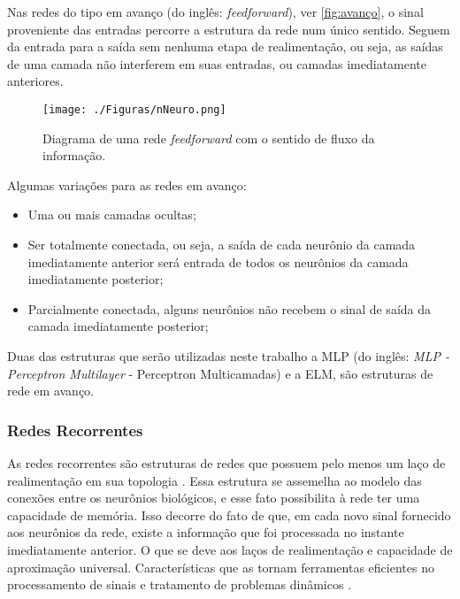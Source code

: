 Nas redes do tipo em avanço (do inglês: \textit{feedforward}), ver \autoref{fig:avanço}, o sinal proveniente das entradas percorre a estrutura da rede num único sentido. Seguem da entrada para a saída sem nenhuma etapa de realimentação, ou seja, as saídas de uma camada não interferem em suas entradas, ou camadas imediatamente anteriores.

\begin{figure}[H]
	\begin{center}
		\caption{Diagrama de uma rede \textit{feedforward} com o sentido de fluxo da informação.}
		\label{fig:avanço}
		\texttt{[image: ./Figuras/nNeuro.png]}%
	\end{center}
\end{figure}

Algumas variações para as redes em avanço:
\begin{itemize}
	\item Uma ou mais camadas ocultas;
	\item Ser totalmente conectada, ou seja, a saída de cada neurônio da camada imediatamente anterior será entrada de todos os neurônios da camada imediatamente posterior;
	\item Parcialmente conectada, alguns neurônios não recebem o sinal de saída da camada imediatamente posterior;
\end{itemize}

Duas das estruturas que serão utilizadas neste trabalho a MLP (do inglês: \textit{MLP - Perceptron Multilayer } - Perceptron Multicamadas) e a ELM, são estruturas de rede em avanço.

\subsubsection{Redes Recorrentes}

As redes recorrentes são estruturas de redes que possuem pelo menos um laço de realimentação em sua topologia \cite{book:simonhaykin2008}. Essa estrutura se assemelha ao modelo das conexões entre os neurônios biológicos, e esse fato possibilita à rede ter uma capacidade de memória. Isso decorre do fato de que, em cada novo sinal fornecido aos neurônios da rede, existe a informação que foi processada no instante imediatamente anterior. O que se deve aos laços de realimentação e capacidade de aproximação universal. Características que as tornam ferramentas eficientes no processamento de sinais e tratamento de problemas dinâmicos \cite{thesis:boccato2013}.

